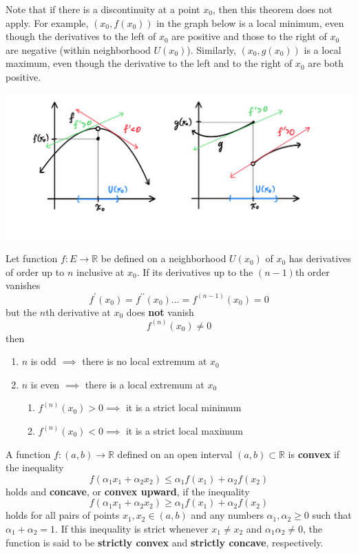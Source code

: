   Note that if there is a discontinuity at a point $x_0$, then this theorem does not apply. For example, $(x_0, f(x_0))$ in the graph below is a local minimum, even though the derivatives to the left of $x_0$ are positive and those to the right of $x_0$ are negative (within neighborhood $U(x_0)$). Similarly, $(x_0, g(x_0))$ is a local maximum, even though the derivative to the left and to the right of $x_0$ are both positive. 
  \begin{center}
      \includegraphics[scale=0.3]{img/Theorem_not_apply_if_Discontinuity.PNG}
  \end{center}

  \begin{theorem}
    Let function $f: E \longrightarrow \mathbb{R}$ be defined on a neighborhood $U(x_0)$ of $x_0$ has derivatives of order up to $n$ inclusive at $x_0$. If its derivatives up to the $(n-1)$th order vanishes 
    \[f^\prime (x_0) = f^{\prime\prime} (x_0) ... = f^{(n-1)} (x_0) = 0\]
    but the $n$th derivative at $x_0$ does \textbf{not} vanish
    \[f^{(n)} (x_0) \neq 0\]
    then 
    \begin{enumerate}
      \item $n$ is odd $\implies$ there is no local extremum at $x_0$ 
      \item $n$ is even $\implies$ there is a local extremum at $x_0$
      \begin{enumerate}
        \item $f^{(n)} (x_0) > 0 \implies$ it is a strict local minimum
        \item $f^{(n)} (x_0) < 0 \implies$ it is a strict local maximum
      \end{enumerate}
    \end{enumerate}
  \end{theorem}

  \begin{definition}
    A function $f: (a, b) \longrightarrow \mathbb{R}$ defined on an open interval $(a, b) \subset \mathbb{R}$ is \textbf{convex} if the inequality
    \[f( \alpha_1 x_1 + \alpha_2 x_2) \leq \alpha_1 f(x_1) + \alpha_2 f(x_2)\]
    holds and \textbf{concave}, or \textbf{convex upward}, if the inequality 
    \[f( \alpha_1 x_1 + \alpha_2 x_2) \geq \alpha_1 f(x_1) + \alpha_2 f(x_2)\]
    holds for all pairs of points $x_1, x_2 \in (a, b)$ and any numbers $\alpha_1, \alpha_2 \geq 0$ such that $\alpha_1 + \alpha_2 = 1$. If this inequality is strict whenever $x_1 \neq x_2$ and $\alpha_1 \alpha_2 \neq 0$, the function is said to be \textbf{strictly convex} and \textbf{strictly concave}, respectively. 
  \end{definition}


